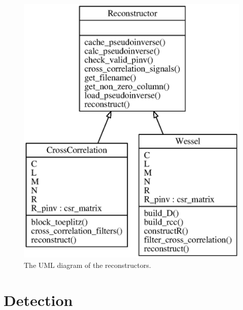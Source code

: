 \documentclass[a4paper, openany, oneside]{memoir}
\begin{document}
\begin{figure}
    \centering
    \includegraphics{./figures/classes_reconstruction.eps}
    \caption{The UML diagram of the reconstructors.}
    \label{fig:umlreconstructor}
\end{figure}

\section{Detection}
\label{sec:detection}
\end{document}

